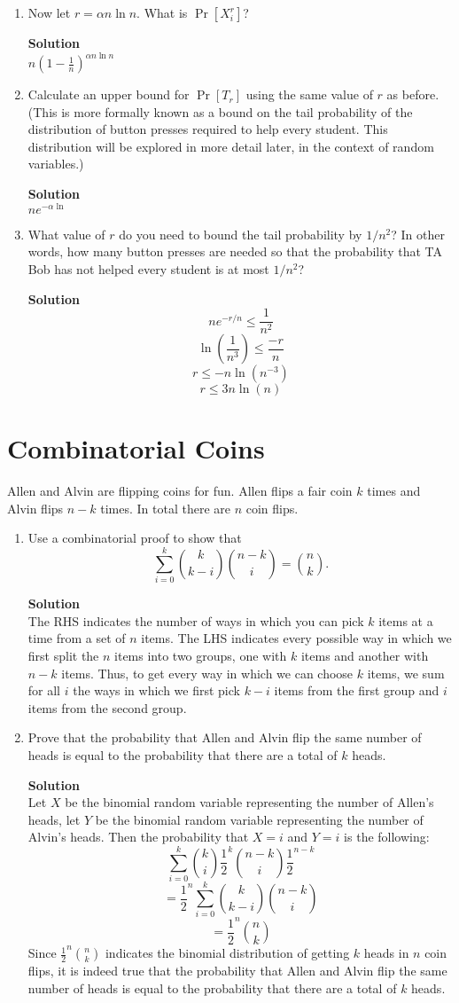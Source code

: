 \documentclass[11pt]{article}
\newcommand*{\Question}[1]{\section{#1}}
\newenvironment{Parts}{\begin{enumerate}[label=(\alph*)]}{\end{enumerate}}
\newcommand*{\Part}{\item}
\newenvironment{Answer}{\vspace{10pt}\begin{mdframed}\textbf{Solution}\\}{\end{mdframed}\vfill\pagebreak[3]}
\newenvironment{Answer}{\vspace{10pt}}{\vfill\pagebreak[3]}
\begin{document}
\begin{Parts}
	\Part Now let $r = \alpha n \ln n$. What is $\Pr[X_i^r]$?
	\begin{Answer}
    $n(1-\frac{1}{n})^{\alpha n \ln n}$
	\end{Answer}

	\Part Calculate an upper bound for $\Pr[T_r]$ using the same value of $r$ as before. (This is more formally known as a bound on the tail probability of the distribution of button presses required to help every student. This distribution will be explored in more detail later, in the context of random variables.)
	\begin{Answer}
    $ne^{-\alpha\ln}$
	\end{Answer}

	\Part What value of $r$ do you need to bound the tail probability by $1/n^2$? In other words, how many button presses are needed so that the probability that TA Bob has not helped every student is at most $1/n^2$?
	\begin{Answer}
    $$ne^{-r/n} \leq \frac{1}{n^2}$$
    $$\ln(\frac{1}{n^3}) \leq \frac{-r}{n}$$
    $$r \leq -n\ln(n^{-3})$$
    $$r \leq 3n\ln(n)$$
	\end{Answer}
\end{Parts}


\Question{Combinatorial Coins}

Allen and Alvin are flipping coins for fun. Allen flips a fair coin $k$ times and Alvin flips $n-k$ times. In total there are $n$ coin flips. 

\begin{Parts}
	\Part Use a combinatorial proof to show that $$\sum_{i=0}^k \binom{k}{k - i} \binom{n - k}{i} = \binom{n}{k}.$$
	\begin{Answer}
        The RHS indicates the number of ways in which you can pick $k$ items at a time from a set of $n$ items. The LHS indicates every possible way in which we first split the $n$ items into two groups, one with $k$ items and another with $n-k$ items. Thus, to get every way in which we can choose $k$ items, we sum for all $i$ the ways in which we first pick $k-i$ items from the first group and $i$ items from the second group.
	\end{Answer}

	\Part Prove that the probability that Allen and Alvin flip the same number of heads is equal to the probability that there are a total of $k$ heads.
	\begin{Answer}
    Let $X$ be the binomial random variable representing the number of Allen's heads, let $Y$ be the binomial random variable representing the number of Alvin's heads. Then the probability that $X=i$ and $Y=i$ is the following:
        $$\sum_{i=0}^k\binom{k}{i}\frac{1}{2}^k\binom{n-k}{i}\frac{1}{2}^{n-k}$$
        $$=\frac{1}{2}^n\sum_{i=0}^k\binom{k}{k-i}\binom{n-k}{i}$$
        $$=\frac{1}{2}^n\binom{n}{k}$$
        Since $\frac{1}{2}^n\binom{n}{k}$ indicates the binomial distribution of getting $k$ heads in $n$ coin flips, it is indeed true that the probability that Allen and Alvin flip the same number of heads is equal to the probability that there are a total of $k$ heads.
	\end{Answer}
\end{Parts}
\end{document}
